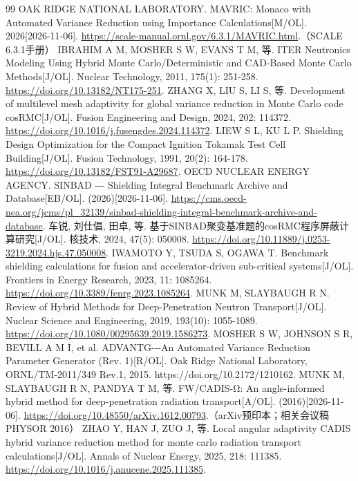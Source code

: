 \documentclass[UTF8, zihao=-4, fontset=none, a4paper]{ctexart}
\begin{document}
\begin{thebibliography}{99}
 OAK RIDGE NATIONAL LABORATORY. MAVRIC: Monaco with Automated Variance Reduction using Importance Calculations{[}M/OL{]}. 2026[2026-11-06]. \url{https://scale-manual.ornl.gov/6.3.1/MAVRIC.html}.（SCALE 6.3.1手册）
 IBRAHIM A M, MOSHER S W, EVANS T M, 等. ITER Neutronics Modeling Using Hybrid Monte Carlo/Deterministic and CAD-Based Monte Carlo Methods{[}J/OL{]}. Nuclear Technology, 2011, 175(1): 251-258. \url{https://doi.org/10.13182/NT175-251}.
 ZHANG X, LIU S, LI S, 等. Development of multilevel mesh adaptivity for global variance reduction in Monte Carlo code cosRMC{[}J/OL{]}. Fusion Engineering and Design, 2024, 202: 114372. \url{https://doi.org/10.1016/j.fusengdes.2024.114372}.
 LIEW S L, KU L P. Shielding Design Optimization for the Compact Ignition Tokamak Test Cell Building{[}J/OL{]}. Fusion Technology, 1991, 20(2): 164-178. \url{https://doi.org/10.13182/FST91-A29687}.
 OECD NUCLEAR ENERGY AGENCY. SINBAD -\/-\/- Shielding Integral Benchmark Archive and Database{[}EB/OL{]}. (2026)[2026-11-06]. \url{https://cms.oecd-nea.org/jcms/pl_32139/sinbad-shielding-integral-benchmark-archive-and-database}.
 车锐, 刘仕倡, 田卓, 等. 基于SINBAD聚变基准题的cosRMC程序屏蔽计算研究{[}J/OL{]}. 核技术, 2024, 47(5): 050008. \url{https://doi.org/10.11889/j.0253-3219.2024.hjs.47.050008}.
 IWAMOTO Y, TSUDA S, OGAWA T. Benchmark shielding calculations for fusion and accelerator-driven sub-critical systems{[}J/OL{]}. Frontiers in Energy Research, 2023, 11: 1085264. \url{https://doi.org/10.3389/fenrg.2023.1085264}.
 MUNK M, SLAYBAUGH R N. Review of Hybrid Methods for Deep-Penetration Neutron Transport{[}J/OL{]}. Nuclear Science and Engineering, 2019, 193(10): 1055-1089. \url{https://doi.org/10.1080/00295639.2019.1586273}.
 MOSHER S W, JOHNSON S R, BEVILL A M I, et al. ADVANTG-\/-\/-An Automated Variance Reduction Parameter Generator (Rev. 1){[}R/OL{]}. Oak Ridge National Laboratory, ORNL/TM-2011/349 Rev.1, 2015. https://doi.org/10.2172/1210162.
 MUNK M, SLAYBAUGH R N, PANDYA T M, 等. FW/CADIS-Ω: An angle-informed hybrid method for deep-penetration radiation transport{[}A/OL{]}. (2016)[2026-11-06]. \url{https://doi.org/10.48550/arXiv.1612.00793}.（arXiv预印本；相关会议稿PHYSOR 2016）
 ZHAO Y, HAN J, ZUO J, 等. Local angular adaptivity CADIS hybrid variance reduction method for monte carlo radiation transport calculations{[}J/OL{]}. Annals of Nuclear Energy, 2025, 218: 111385. \url{https://doi.org/10.1016/j.anucene.2025.111385}.

\end{thebibliography}
\end{document}
